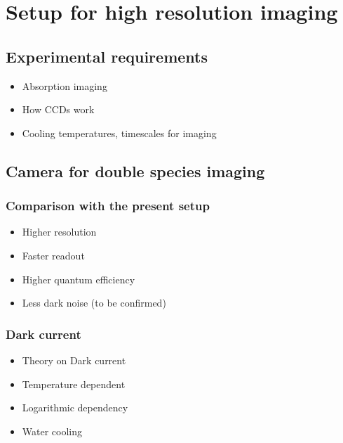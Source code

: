 \chapter{Setup for high resolution imaging}

\section{Experimental requirements}
\begin{itemize}
	\item Absorption imaging
	\item How CCDs work
	\item Cooling temperatures, timescales for imaging
\end{itemize}

\section{Camera for double species imaging}
\subsection{Comparison with the present setup}
\begin{itemize}
	\item Higher resolution
	\item Faster readout
	\item Higher quantum efficiency
	\item Less dark noise (to be confirmed)
\end{itemize}

\subsection{Dark current}
\begin{itemize}
	\item Theory on Dark current
	\item Temperature dependent
	\item Logarithmic dependency
	\item Water cooling
\end{itemize}

